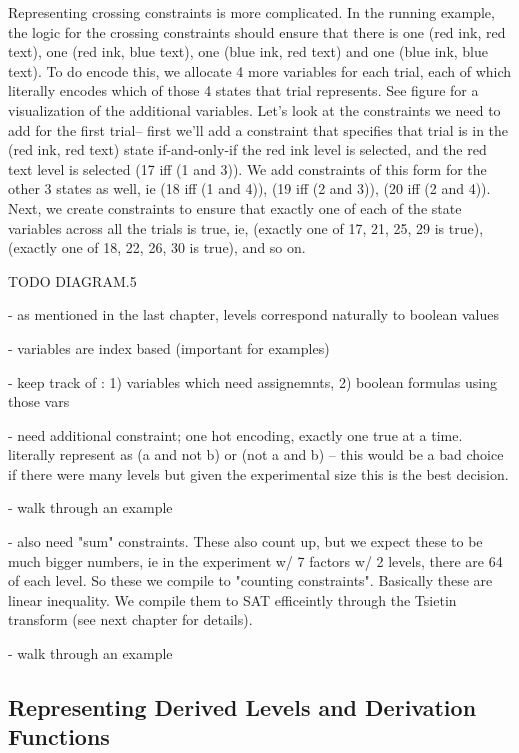 Representing crossing constraints is more complicated. In the running example, the logic for the crossing constraints should ensure that there is one (red ink, red text), one (red ink, blue text), one (blue ink, red text) and one (blue ink, blue text). To do encode this, we allocate 4 more variables for each trial, each of which literally encodes which of those 4 states that trial represents. See figure  for a visualization of the additional variables. Let's look at the constraints we need to add for the first trial-- first we'll add a constraint that specifies that trial is in the (red ink, red text) state if-and-only-if the red ink level is selected, and the red text level is selected (17 iff (1 and 3)). We add constraints of this form for the other 3 states as well, ie (18 iff (1 and 4)), (19 iff (2 and 3)), (20 iff (2 and 4)). Next, we create constraints to ensure that exactly one of each of the state variables across all the trials is true, ie, (exactly one of 17, 21, 25, 29 is true), (exactly one of 18, 22, 26, 30 is true), and so on. 


 TODO DIAGRAM.5

- as mentioned in the last chapter, levels correspond naturally to boolean values

- variables are index based (important for examples)

- keep track of : 1) variables which need assignemnts, 2) boolean formulas using those vars

- need additional constraint; one hot encoding, exactly one true at a time. literally represent as (a and not b) or (not a and b) -- this would be a bad choice if there were many levels but given the experimental size this is the best decision.

- walk through an example

- also need "sum" constraints. These also count up, but we expect these to be much bigger numbers, ie in the experiment w/ 7 factors w/ 2 levels, there are 64 of each level. So these we compile to "counting constraints". Basically these are linear inequality. We compile them to SAT efficeintly through the Tsietin transform (see next chapter for details).

- walk through an example

\subsection{Representing Derived Levels and Derivation Functions}

